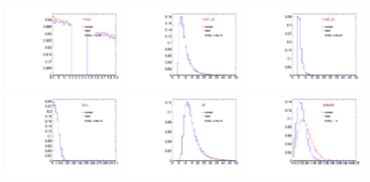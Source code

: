 \begin{figure}
  \includegraphics[width=0.3\textwidth]{Figures/VariablesComparison/Data_barrel_figs/m}
  \includegraphics[width=0.3\textwidth]{Figures/VariablesComparison/Data_barrel_figs/m1pt}
  \includegraphics[width=0.3\textwidth]{Figures/VariablesComparison/Data_barrel_figs/m2pt}
  \includegraphics[width=0.3\textwidth]{Figures/VariablesComparison/Data_barrel_figs/maxdoca}
  \includegraphics[width=0.3\textwidth]{Figures/VariablesComparison/Data_barrel_figs/pt}
  \includegraphics[width=0.3\textwidth]{Figures/VariablesComparison/Data_barrel_figs/pvip}

\end{figure}
